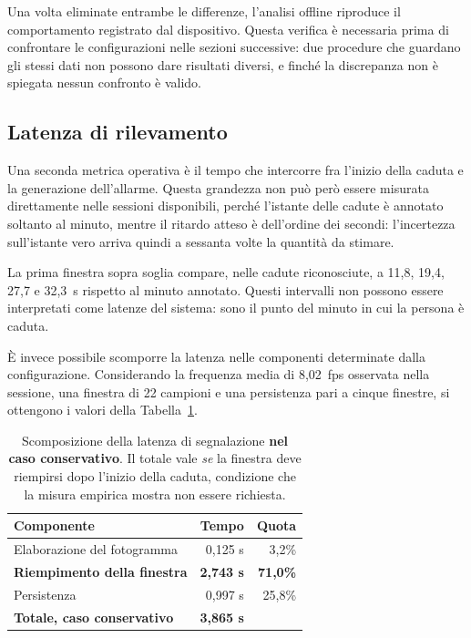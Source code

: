 Una volta eliminate entrambe le differenze, l'analisi offline riproduce il comportamento registrato dal dispositivo. Questa verifica è necessaria prima di confrontare le configurazioni nelle sezioni successive: due procedure che guardano gli stessi dati non possono dare risultati diversi, e finché la discrepanza non è spiegata nessun confronto è valido.

\subsection{Latenza di rilevamento}
\label{sec:latenza}

Una seconda metrica operativa è il tempo che intercorre fra l'inizio della caduta e la generazione dell'allarme. Questa grandezza non può però essere misurata direttamente nelle sessioni disponibili, perché l'istante delle cadute è annotato soltanto al minuto, mentre il ritardo atteso è dell'ordine dei secondi: l'incertezza sull'istante vero arriva quindi a sessanta volte la quantità da stimare.

La prima finestra sopra soglia compare, nelle cadute riconosciute, a 11,8, 19,4, 27,7 e 32,3~s rispetto al minuto annotato. Questi intervalli non possono essere interpretati come latenze del sistema: sono il punto del minuto in cui la persona è caduta.

È invece possibile scomporre la latenza nelle componenti determinate dalla configurazione. Considerando la frequenza media di 8,02~fps osservata nella sessione, una finestra di 22 campioni e una persistenza pari a cinque finestre, si ottengono i valori della Tabella~\ref{tab:latenza}.

\begin{table}[ht]
\centering
\caption{Scomposizione della latenza di segnalazione \textbf{nel caso
conservativo}. Il totale vale \emph{se} la finestra deve riempirsi dopo
l'inizio della caduta, condizione che la misura empirica mostra non essere
richiesta.}
\label{tab:latenza}
\begin{tabular}{lrr}
\toprule
\textbf{Componente} & \textbf{Tempo} & \textbf{Quota} \\
\midrule
Elaborazione del fotogramma & 0,125 s & 3,2\% \\
\textbf{Riempimento della finestra} & \textbf{2,743 s} & \textbf{71,0\%} \\
Persistenza & 0,997 s & 25,8\% \\
\midrule
\textbf{Totale, caso conservativo} & \textbf{3,865 s} & \\
\bottomrule
\end{tabular}
\end{table}

